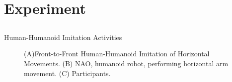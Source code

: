 
\section{Experiment}

\subsection{}
{

\begin{frame}{Human-Humanoid Imitation Activities}
    \begin{figure}
	\caption[PA]{(A)Front-to-Front Human-Humanoid Imitation 
		of Horizontal Movements.
		(B) NAO, humanoid robot, performing horizontal arm movement.
		(C) Participants.
		}
   \end{figure}
	
\end{frame}
}


